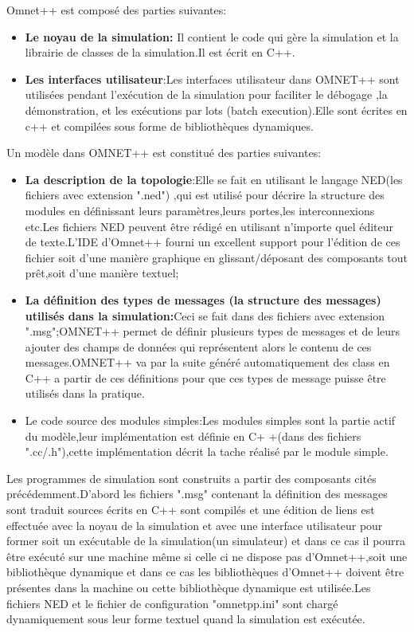 Omnet++ est composé des parties suivantes:

\begin{itemize}
\item \textbf{ Le noyau de la simulation:} Il contient le code qui gère la simulation et la librairie de classes de la simulation.Il est écrit en C++.
\item \textbf{ Les interfaces utilisateur}:Les interfaces utilisateur dans OMNET++ sont utilisées pendant l'exécution de la simulation pour faciliter le débogage  ,la démonstration, et les exécutions par lots (batch execution).Elle sont écrites en c++ et compilées sous forme de bibliothèques dynamiques.	
\end{itemize}

Un modèle dans OMNET++ est constitué des parties suivantes:
\begin{itemize}
	\item \textbf{La description de la topologie}:Elle se fait en utilisant le langage NED(les fichiers avec extension ".ned") ,qui est utilisé pour décrire la structure des modules en définissant leurs paramètres,leurs portes,les interconnexions etc.Les fichiers NED peuvent être rédigé en utilisant n'importe quel éditeur de texte.L'IDE d'Omnet++ fourni un excellent support pour l'édition de ces fichier soit d'une manière graphique en glissant/déposant des composants tout prêt,soit d'une manière textuel;
	\item\textbf{ La définition des types de messages (la structure des messages) utilisés dans la simulation:}Ceci se fait dans des fichiers avec extension ".msg";OMNET++ permet de définir plusieurs types de messages  et de leurs ajouter des champs de données qui représentent alors le contenu de ces messages.OMNET++ va par la suite généré automatiquement des class en C++ a partir de ces définitions pour que ces types de message puisse être utilisés dans la pratique.
	\item Le code source des modules simples:Les modules simples sont la partie actif du modèle,leur implémentation est définie en C+ +(dans des fichiers ".cc/.h"),cette implémentation décrit la tache réalisé par le module simple.
\end{itemize}	

Les programmes de simulation sont construits a partir des composants cités précédemment.D'abord les fichiers ".msg" contenant la définition des messages sont traduit sources écrits en C++ sont compilés et une édition de liens est effectuée avec la noyau de la simulation et avec une interface utilisateur pour former soit un exécutable de la simulation(un simulateur) et dans ce cas il pourra être exécuté sur une machine même si celle ci ne dispose pas d'Omnet++,soit une bibliothèque dynamique et dans ce cas les bibliothèques d'Omnet++ doivent être présentes dans la machine ou cette bibliothèque dynamique est utilisée.Les fichiers NED et le fichier de configuration "omnetpp.ini" sont chargé dynamiquement sous leur forme textuel quand la simulation est exécutée.

